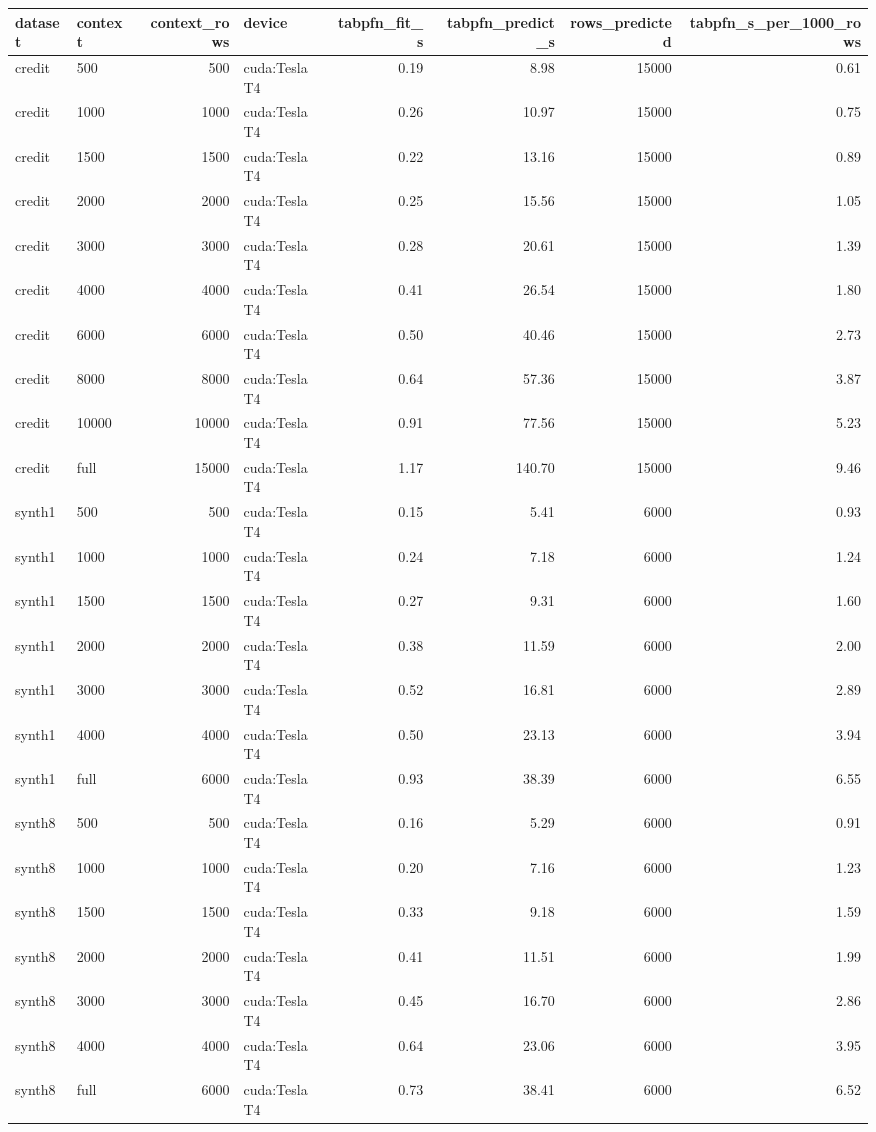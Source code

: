 \begin{tabular}{llrlrrrr}
\toprule
dataset & context & context_rows & device & tabpfn_fit_s & tabpfn_predict_s & rows_predicted & tabpfn_s_per_1000_rows \\
\midrule
credit & 500 & 500 & cuda:Tesla T4 & 0.19 & 8.98 & 15000 & 0.61 \\
credit & 1000 & 1000 & cuda:Tesla T4 & 0.26 & 10.97 & 15000 & 0.75 \\
credit & 1500 & 1500 & cuda:Tesla T4 & 0.22 & 13.16 & 15000 & 0.89 \\
credit & 2000 & 2000 & cuda:Tesla T4 & 0.25 & 15.56 & 15000 & 1.05 \\
credit & 3000 & 3000 & cuda:Tesla T4 & 0.28 & 20.61 & 15000 & 1.39 \\
credit & 4000 & 4000 & cuda:Tesla T4 & 0.41 & 26.54 & 15000 & 1.80 \\
credit & 6000 & 6000 & cuda:Tesla T4 & 0.50 & 40.46 & 15000 & 2.73 \\
credit & 8000 & 8000 & cuda:Tesla T4 & 0.64 & 57.36 & 15000 & 3.87 \\
credit & 10000 & 10000 & cuda:Tesla T4 & 0.91 & 77.56 & 15000 & 5.23 \\
credit & full & 15000 & cuda:Tesla T4 & 1.17 & 140.70 & 15000 & 9.46 \\
synth1 & 500 & 500 & cuda:Tesla T4 & 0.15 & 5.41 & 6000 & 0.93 \\
synth1 & 1000 & 1000 & cuda:Tesla T4 & 0.24 & 7.18 & 6000 & 1.24 \\
synth1 & 1500 & 1500 & cuda:Tesla T4 & 0.27 & 9.31 & 6000 & 1.60 \\
synth1 & 2000 & 2000 & cuda:Tesla T4 & 0.38 & 11.59 & 6000 & 2.00 \\
synth1 & 3000 & 3000 & cuda:Tesla T4 & 0.52 & 16.81 & 6000 & 2.89 \\
synth1 & 4000 & 4000 & cuda:Tesla T4 & 0.50 & 23.13 & 6000 & 3.94 \\
synth1 & full & 6000 & cuda:Tesla T4 & 0.93 & 38.39 & 6000 & 6.55 \\
synth8 & 500 & 500 & cuda:Tesla T4 & 0.16 & 5.29 & 6000 & 0.91 \\
synth8 & 1000 & 1000 & cuda:Tesla T4 & 0.20 & 7.16 & 6000 & 1.23 \\
synth8 & 1500 & 1500 & cuda:Tesla T4 & 0.33 & 9.18 & 6000 & 1.59 \\
synth8 & 2000 & 2000 & cuda:Tesla T4 & 0.41 & 11.51 & 6000 & 1.99 \\
synth8 & 3000 & 3000 & cuda:Tesla T4 & 0.45 & 16.70 & 6000 & 2.86 \\
synth8 & 4000 & 4000 & cuda:Tesla T4 & 0.64 & 23.06 & 6000 & 3.95 \\
synth8 & full & 6000 & cuda:Tesla T4 & 0.73 & 38.41 & 6000 & 6.52 \\
\bottomrule
\end{tabular}
